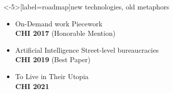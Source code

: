 \documentclass[presentation]{subfiles}
\begin{document}
\begin{frame}<-5>[label=roadmap]{new technologies, old metaphors}

    \begin{itemize}
      \item<1-6,8,10>[] \alert<5>{On-Demand work \hfill Piecework
            \\\hfill{\footnotesize \textsc{\textbf{CHI 2017}}} {\scriptsize(Honorable Mention)}}
      
      \vspace{1em}

      \item<2-4,6-8,10>[] \alert<7>{Artificial Intelligence \hfill Street-level bureaucracies
            \\\hfill{\footnotesize \textsc{\textbf{CHI 2019}}} {\scriptsize(Best Paper)}}

      \vspace{1em}

      \item<3-4,6,8-10>[] \alert<9>{\hfill To Live in Their Utopia
            \\\hfill{\footnotesize \textsc{\textbf{CHI 2021}}}}


    \end{itemize}

\end{frame}
\end{document}
